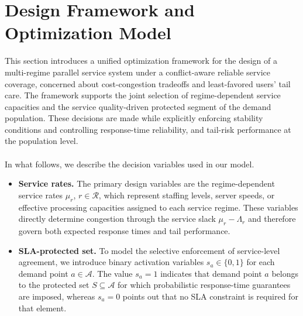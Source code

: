 \documentclass[letter,11pt, reqno]{amsart}
\begin{document}
\section{Design Framework and Optimization Model}
\label{sec:design_framework}

This section introduces a unified optimization framework for the design of a multi-regime parallel service system under a conflict-aware reliable service coverage, concerned about cost-congestion tradeoffs and least-favored users' tail care. The framework
supports the joint selection of regime-dependent service capacities and the service quality-driven protected segment of the demand population. These decisions are made while explicitly enforcing stability conditions and controlling response-time reliability, and tail-risk performance at the population level. \\


\\

\noindent In what follows, we describe the decision variables used in our model.
\begin{itemize}
\item[-] \textbf{Service rates.} The primary design variables are the regime-dependent service rates
$\mu_r$, $r\in\mathcal{R}$, which represent staffing levels, server speeds, or
effective processing capacities assigned to each service regime. These variables
directly determine congestion through the service slack $\mu_r-\Lambda_r$ and
therefore govern both expected response times and tail performance.
\item[-] \textbf{SLA-protected set.} To model the selective enforcement of service-level agreement, we introduce
binary activation variables $s_a\in\{0,1\}$ for each demand point
$a\in\mathcal{A}$. The value $s_a=1$ indicates that demand point $a$ belongs to the
protected set $S\subseteq\mathcal{A}$ for which probabilistic response-time
guarantees are imposed, whereas $s_a=0$ points out that no SLA constraint is required for that element.\\
\end{itemize}

\\
\end{document}

